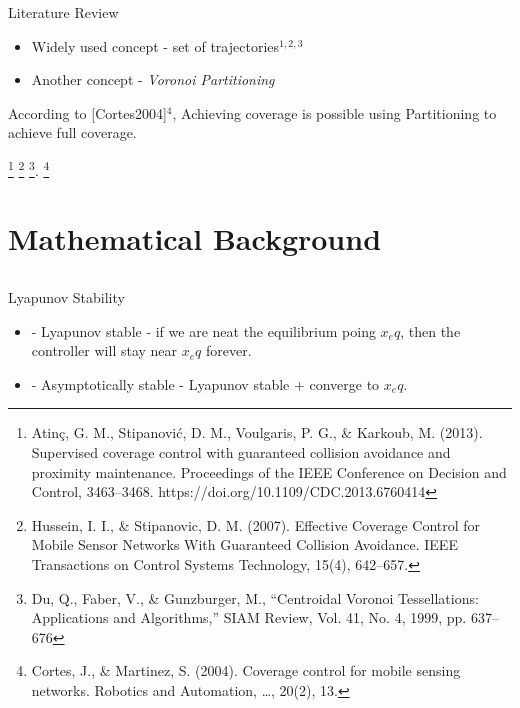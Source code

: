 \documentclass[t]{beamer}
\begin{document}
\begin{frame}[label=litrev2]{Literature Review}
\begin{itemize}
\item<1-> Widely used concept - set of trajectories$^{1,2,3}$
\item<2-> Another concept - \textit{Voronoi Partitioning}
\end{itemize}
\pause
According to [Cortes2004]$^{4}$, Achieving coverage is possible using Partitioning to achieve full coverage.


\footnote[1]{\tiny Atinç, G. M., Stipanović, D. M., Voulgaris, P. G., \& Karkoub, M. (2013). Supervised coverage control with guaranteed collision avoidance and proximity maintenance. Proceedings of the IEEE Conference on Decision and Control, 3463–3468. https://doi.org/10.1109/CDC.2013.6760414}
\footnote[2]{\tiny Hussein, I. I., \& Stipanovic, D. M. (2007). Effective Coverage Control for Mobile Sensor Networks With Guaranteed Collision Avoidance. IEEE Transactions on Control Systems Technology, 15(4), 642–657.}
\footnote[3]{\tiny Du, Q., Faber, V., \& Gunzburger, M., “Centroidal Voronoi Tessellations: Applications
and Algorithms,” SIAM Review, Vol. 41, No. 4, 1999, pp. 637–676}.
\footnote[4]{\tiny Cortes, J., \& Martinez, S. (2004). Coverage control for mobile sensing networks. Robotics and Automation, …, 20(2), 13.}
\end{frame}


\section[Mathematical Background]{Mathematical Background}
\subsection[Lyaponov Stability]{}
\begin{frame}[label=lyapunovstability1]{Lyapunov Stability}
\begin{itemize}
\item<1-> - Lyapunov stable - if we are neat the equilibrium poing $x_eq$, then the controller will stay near $x_eq$ forever.
\item<2-> - Asymptotically stable - Lyapunov stable + converge to $x_eq$.
\end{itemize}
\end{frame}
\end{document}
